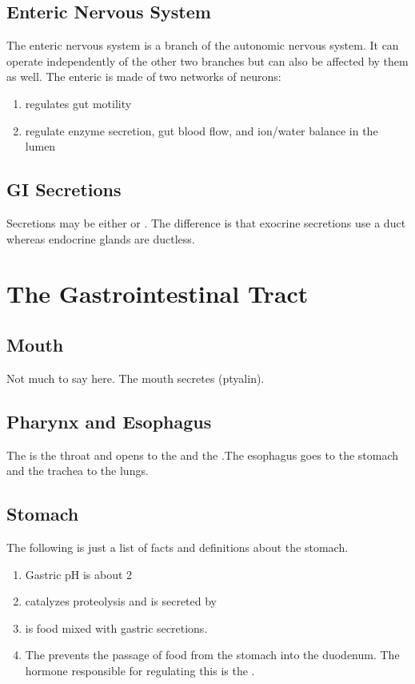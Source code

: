 \documentclass[../Bio_chemistryReview.tex]{subfiles}
\begin{document}
\subsection{Enteric Nervous System}
The enteric nervous system is a branch of the autonomic nervous system. It can
operate independently of the other two branches but can also be affected by them
as well. The enteric is made of two networks of neurons:
\begin{enumerate}
    \item {} regulates gut motility
    \item {} regulate enzyme secretion, gut blood flow,
        and ion/water balance in the lumen
\end{enumerate}

\subsection{GI Secretions}
Secretions may be either  or . The difference
is that exocrine secretions use a duct whereas endocrine glands are ductless. 

\section{The Gastrointestinal Tract}
\subsection{Mouth}
Not much to say here. The mouth secretes  (ptyalin).

\subsection{Pharynx and Esophagus}
The  is the throat and opens to the  and the
.The esophagus goes to the stomach and the trachea to the
lungs.

\subsection{Stomach}
The following is just a list of facts and definitions about the stomach.
\begin{enumerate}
    \item Gastric pH is about 2
    \item {} catalyzes proteolysis and is secreted by 
    \item {} is food mixed with gastric secretions.
    \item The  prevents the passage of food from the
        stomach into the duodenum. The hormone responsible for regulating this
        is the .
\end{enumerate}
\end{document}
